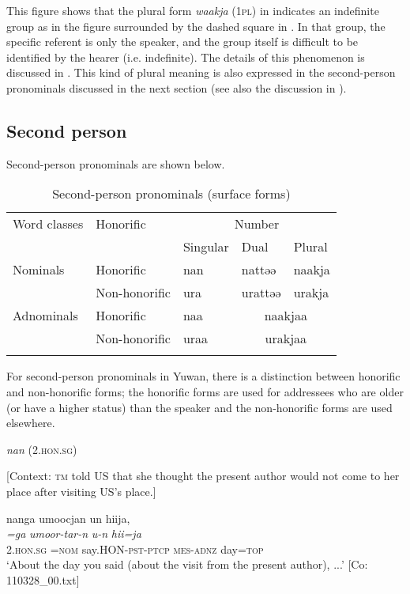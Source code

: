 This figure shows that the plural form \textit{waakja} (1\textsc{pl}) in  indicates an indefinite group as in the figure surrounded by the dashed square in . In that group, the specific referent is only the speaker, and the group itself is difficult to be identified by the hearer (i.e. indefinite). The details of this phenomenon is discussed in \citet{Niinaga2020b}.
This kind of plural meaning is also expressed in the second-person pronominals discussed in the next section (see also the discussion in ).

\subsection{Second person} \label{sec:5.1.2}

Second-person pronominals are shown below.

\begin{table}
\caption{\label{tab:key:34}Second-person pronominals (surface forms)}
\begin{tabular}{lllll}
\lsptoprule
Word classes  & Honorific & \multicolumn{3}{c}{Number}\\\cmidrule(lr){3-5}
              &           &    Singular & Dual & Plural\\\midrule
Nominals & Honorific & nan & nattəə & naakja\\
         & Non-honorific & ura & urattəə & urakja\\
Adnominals & Honorific & naa & \multicolumn{2}{c}{naakjaa}\\
           & Non-honorific & uraa & \multicolumn{2}{c}{urakjaa}\\
\lspbottomrule
\end{tabular}
\end{table}

\noindent For second-person pronominals in Yuwan, there is a distinction between honorific and non-honorific forms; the honorific forms are used for addressees who are older (or have a higher status) than the speaker and the non-honorific forms are used elsewhere.

\ea \label{ex:5:9}  \ea \label{ex:5:9a} \textit{nan} (2.\textsc{hon}.\textsc{sg})

    [Context: \textsc{tm} told US that she thought the present author would not come to her place after visiting US’s place.]

\glll  nanga  umoocjan  un  hiija,\\
\textit{=ga}  \textit{umoor-tar-n}  \textit{u-n}  \textit{hii=ja}\\
2.\textsc{hon}.\textsc{sg} =\textsc{nom}  say.HON-\textsc{pst}-\textsc{ptcp}  \textsc{mes}-\textsc{adnz}  day=\textsc{top}\\
\glt ‘About the day you said (about the visit from the present author), ...’ [Co: 110328\_00.txt]

